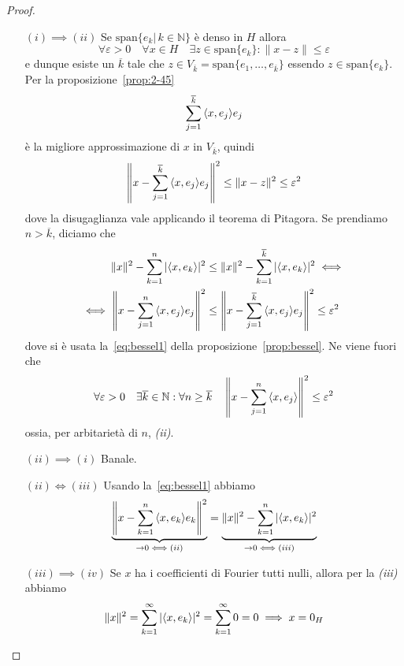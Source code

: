 \begin{proof} \(\)
    \begin{enumerate}
        \item [\((i) \implies (ii)\)]
        Se \(\mathrm{span}
        \{e_{k} | \, k \in \mathbb{N}\} \) è denso in \(H\) allora 
        \[
          \forall \varepsilon > 0 \quad \forall x \in H \quad \exists z \in
          \mathrm{span}\{e_{k}\} : \|x - z\| \le \varepsilon
        \]
        e dunque esiste un \(\overline{k}\) tale che \(z \in V_{\overline{k}} =
        \mathrm{span}\{e_{1}, \dots, e_{\overline k}\}  \)
        essendo \(z \in \mathrm{span}\{e_{k}\}\). Per la
        proposizione~\ref{prop:2-45} \[\sum_{j=1}^{\overline{k}} {\left\langle x,
        e_{j}\right\rangle} e_{j}\] è la migliore approssimazione di \(x\) in \(V_{\overline{k}}
        \), quindi 
        \[
          \left\|x - \sum_{j=1}^{\overline{k}} {\left\langle x, e_{j}\right\rangle} e_{j} \right\|^2 \le
          \|x - z\|^2 \le \varepsilon^2
        \]
        dove la disugaglianza vale applicando il teorema di Pitagora. Se prendiamo \(n > \overline{k}\), diciamo che
        \begin{align*}
            \|x\|^2 - \sum_{k=1}^{n} |{\left\langle x, e_{k}\right\rangle}|^2 &\le \|x\|^2 -
            \sum_{k=1}^{\overline{k}} |{\left\langle x, e_{k}\right\rangle}|^2 \iff \\ \iff
            \left\|x - \sum_{j=1}^{n} {\left\langle x, e_{j}\right\rangle}e_{j}  \right\|^2 &\le \left\| x
            - \sum_{j=1}^{\overline{k}} {\left\langle x, e_{j}\right\rangle} e_{j} \right\|^2 \le
            \varepsilon^2
        \end{align*} dove si è usata la~\eqref{eq:bessel1} della
        proposizione~\ref{prop:bessel}. Ne viene fuori che 
        \[
          \forall \varepsilon > 0 \quad \exists \overline{k} \in \mathbb{N} :
          \forall n \ge \overline{k} \quad \left\|x - \sum_{j=1}^{n} {\left\langle x,
          e_{j}\right\rangle}\right\|^2 \le \varepsilon^2
        \]
        ossia, per arbitarietà di \(n\), \textit{(ii)}.

    \item [\((ii) \implies (i)\)] Banale.

    \item [\((ii) \iff (iii)\)] Usando la~\eqref{eq:bessel1} abbiamo
    \[
        \underbrace{\left\| x - \sum_{k=1}^{n} {\left\langle x, e_{k}\right\rangle} e_{k}
        \right\|^2}_{\to 0 \iff (ii)}  =
      \underbrace{\|x\|^2 - \sum_{k=1}^{n} |{\left\langle x, e_{k}\right\rangle} |^2}_{\to 0 \iff
      (iii)} 
    \]
    \item [\((iii) \implies (iv)\)] Se \(x\) ha i coefficienti di Fourier tutti nulli, allora per la
    \textit{(iii)} abbiamo
    \[
      \|x\|^2 = \sum_{k=1}^{\infty} |{\left\langle x, e_{k}\right\rangle} |^2 = \sum_{k=1}^{\infty} 0
      = 0 \implies x = 0_H
    \]


\end{enumerate}
\end{proof}
